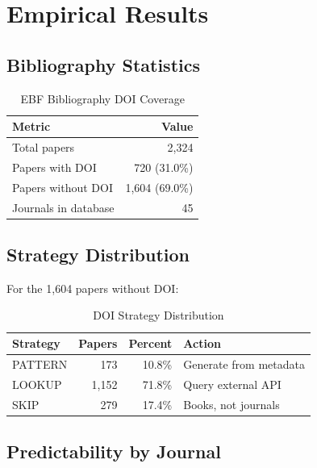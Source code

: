 \section{Empirical Results}
\label{sec:results}

\subsection{Bibliography Statistics}

\begin{table}[h]
\centering
\caption{EBF Bibliography DOI Coverage}
\begin{tabular}{lr}
\toprule
\textbf{Metric} & \textbf{Value} \\
\midrule
Total papers & 2,324 \\
Papers with DOI & 720 (31.0\%) \\
Papers without DOI & 1,604 (69.0\%) \\
Journals in database & 45 \\
\bottomrule
\end{tabular}
\end{table}

\subsection{Strategy Distribution}

For the 1,604 papers without DOI:

\begin{table}[h]
\centering
\caption{DOI Strategy Distribution}
\begin{tabular}{lrrl}
\toprule
\textbf{Strategy} & \textbf{Papers} & \textbf{Percent} & \textbf{Action} \\
\midrule
PATTERN & 173 & 10.8\% & Generate from metadata \\
LOOKUP & 1,152 & 71.8\% & Query external API \\
SKIP & 279 & 17.4\% & Books, not journals \\
\bottomrule
\end{tabular}
\end{table}

\subsection{Predictability by Journal}

